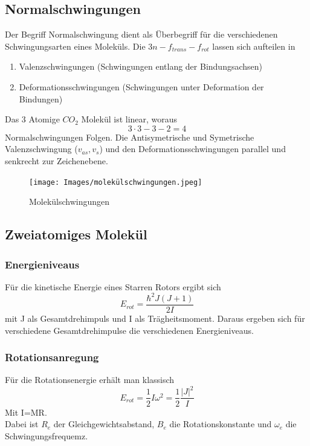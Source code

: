 \documentclass{article}
\begin{document}
    \subsection{Normalschwingungen}
        Der Begriff Normalschwingung dient als Überbegriff für die verschiedenen Schwingungsarten eines Moleküls.
        Die $3n-f_{trans} - f_{rot}$ lassen sich aufteilen in
        \begin{enumerate}
            \item Valenzschwingungen (Schwingungen entlang der Bindungsachsen)
            \item Deformationsschwingungen (Schwingungen unter Deformation der Bindungen)
        \end{enumerate}
        Das 3 Atomige $CO_2$ Molekül ist linear, woraus 
        $$ 3\cdot 3 - 3 - 2 = 4$$
        Normalschwingungen Folgen. Die Antisymetrische und Symetrische Valenzschwingung ($v_{as}, v_s$) und den
        Deformationsschwingungen parallel und senkrecht zur Zeichenebene.
        \begin{figure}
            \centering
            \texttt{[image: Images/molekülschwingungen.jpeg]}
            \caption{Molekülschwingungen}
        \end{figure}
    
    \subsection{Zweiatomiges Molekül}
        \subsubsection{Energieniveaus}
            Für die kinetische Energie eines Starren Rotors ergibt sich 
            \begin{equation}
                E_{rot} = \frac{\hbar^2 J(J+1)}{2I}
            \end{equation}
            mit J als Gesamtdrehimpuls und I als Trägheitsmoment. Daraus ergeben sich für verschiedene
            Gesamtdrehimpulse die verschiedenen Energieniveaus.
        \subsubsection{Rotationsanregung}
            Für die Rotationsenergie erhält man klassisch
            \begin{equation}
                E_{rot} = \frac{1}{2}I\omega^2=\frac{1}{2}\frac{\vert J\vert^2}{I}
            \end{equation}
            Mit I=MR.\\
            Dabei ist $R_e$ der Gleichgewichtsabstand, $B_e$ die Rotationskonstante und $\omega_e$ die Schwingungsfrequemz.
\end{document}
